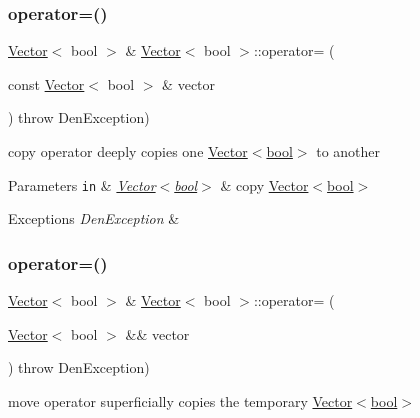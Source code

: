 \subsubsection{\texorpdfstring{operator=()}{operator=()}\hspace{0.1cm}{\footnotesize\ttfamily [1/2]}}
{\footnotesize\ttfamily \hyperlink{classVector}{Vector}$<$ bool $>$ \& \hyperlink{classVector}{Vector}$<$ bool $>$\+::operator= (\begin{DoxyParamCaption}\item[{const \hyperlink{classVector}{Vector}$<$ bool $>$ \&}]{vector }\end{DoxyParamCaption}) throw  Den\+Exception) }



copy operator  deeply copies one \hyperlink{classVector_3_01bool_01_4}{Vector$<$bool$>$} to another 


\begin{DoxyParams}[1]{Parameters}
\mbox{\tt in}  & {\em \hyperlink{classVector_3_01bool_01_4}{Vector$<$bool$>$}} & copy \hyperlink{classVector_3_01bool_01_4}{Vector$<$bool$>$} \\
\hline
\end{DoxyParams}

\begin{DoxyExceptions}{Exceptions}
{\em Den\+Exception} & \\
\hline
\end{DoxyExceptions}
\mbox{\label{classVector_3_01bool_01_4_a025822477d0628b78d8952b6fce63915}} 
\subsubsection{\texorpdfstring{operator=()}{operator=()}\hspace{0.1cm}{\footnotesize\ttfamily [2/2]}}
{\footnotesize\ttfamily \hyperlink{classVector}{Vector}$<$ bool $>$ \& \hyperlink{classVector}{Vector}$<$ bool $>$\+::operator= (\begin{DoxyParamCaption}\item[{\hyperlink{classVector}{Vector}$<$ bool $>$ \&\&}]{vector }\end{DoxyParamCaption}) throw  Den\+Exception) }



move operator  superficially copies the temporary \hyperlink{classVector_3_01bool_01_4}{Vector$<$bool$>$} 


